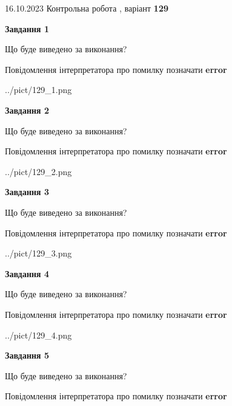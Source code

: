 \documentclass[12pt, ukrainian]{article}
\begin{document}
{\Large{16.10.2023 Контрольна робота , варіант  \No \textbf { 129 }\par}}
{
\begin {large}
{\begin {center}\textbf{Завдання 1}\end {center}}\par
Що буде виведено за виконання? \par
Повідомлення інтерпретатора про помилку позначати \textbf{error}

\begin{center}
	{../pict/129_1.png}
\end{center}
\newpage

{\begin {center}\textbf{Завдання 2}\end {center}}\par
Що буде виведено за виконання? \par
Повідомлення інтерпретатора про помилку позначати \textbf{error}

\begin{center}
	{../pict/129_2.png}
\end{center}
\newpage

{\begin {center}\textbf{Завдання 3}\end {center}}\par
Що буде виведено за виконання? \par
Повідомлення інтерпретатора про помилку позначати \textbf{error}

\begin{center}
	{../pict/129_3.png}
\end{center}
\newpage

{\begin {center}\textbf{Завдання 4}\end {center}}\par
Що буде виведено за виконання? \par
Повідомлення інтерпретатора про помилку позначати \textbf{error}

\begin{center}
	{../pict/129_4.png}
\end{center}
\newpage

{\begin {center}\textbf{Завдання 5}\end {center}}\par
Що буде виведено за виконання? \par
Повідомлення інтерпретатора про помилку позначати \textbf{error}


\end{large}}
\end{document}
